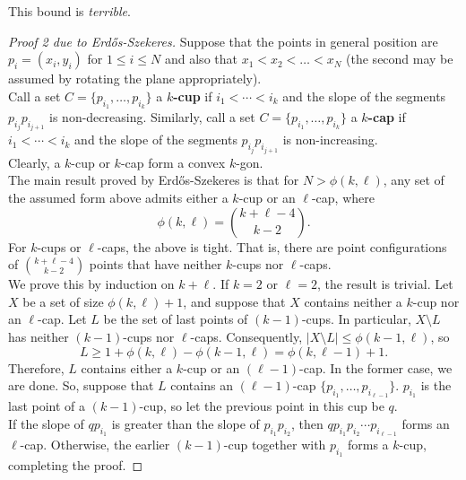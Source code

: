	 This bound is \emph{terrible}.

	 \begin{proof}[Proof 2 due to Erd\H{o}s-Szekeres]
	 	Suppose that the points in general position are $p_i = (x_i,y_i)$ for $1\le i\le N$ and also that $x_1 < x_2 < \ldots < x_N$ (the second may be assumed by rotating the plane appropriately).\\
	 	Call a set $C = \{p_{i_1},\ldots,p_{i_k}\}$ a \textbf{$k$-cup} if $i_1 < \cdots < i_k$ and the slope of the segments $p_{i_j} p_{i_{j+1}}$ is non-decreasing. Similarly, call a set $C = \{p_{i_1},\ldots,p_{i_k}\}$ a \textbf{$k$-cap} if $i_1 < \cdots < i_k$ and the slope of the segments $p_{i_j} p_{i_{j+1}}$ is non-increasing.\\
	 	Clearly, a $k$-cup or $k$-cap form a convex $k$-gon.\\

	 	The main result proved by Erd\H{o}s-Szekeres is that for $N > \phi(k,\ell)$, any set of the assumed form above admits either a $k$-cup or an $\ell$-cap, where
	 	\[ \phi(k,\ell) = \binom{k+\ell-4}{k-2}. \]
	 	For $k$-cups or $\ell$-caps, the above is tight. That is, there are point configurations of $\binom{k+\ell-4}{k-2}$ points that have neither $k$-cups nor $\ell$-caps.\\
	 	We prove this by induction on $k+\ell$. If $k=2$ or $\ell=2$, the result is trivial. Let $X$ be a set of size $\phi(k,\ell)+1$, and suppose that $X$ contains neither a $k$-cup nor an $\ell$-cap. Let $L$ be the set of last points of $(k-1)$-cups. In particular, $X \setminus L$ has neither $(k-1)$-cups nor $\ell$-caps. Consequently, $|X\setminus L| \le \phi(k-1,\ell)$, so
	 	\[ L \ge 1 + \phi(k,\ell) - \phi(k-1,\ell) = \phi(k,\ell-1) + 1. \]
	 	Therefore, $L$ contains either a $k$-cup or an $(\ell-1)$-cap. In the former case, we are done. So, suppose that $L$ contains an $(\ell-1)$-cap $\{p_{i_1},\ldots,p_{i_{\ell-1}}\}$. $p_{i_1}$ is the last point of a $(k-1)$-cup, so let the previous point in this cup be $q$.\\
	 	If the slope of $qp_{i_1}$ is greater than the slope of $p_{i_1}p_{i_2}$, then $qp_{i_1}p_{i_2}\cdots p_{i_{\ell-1}}$ forms an $\ell$-cap. Otherwise, the earlier $(k-1)$-cup together with $p_{i_1}$ forms a $k$-cup, completing the proof.  
	 \end{proof}
	 

